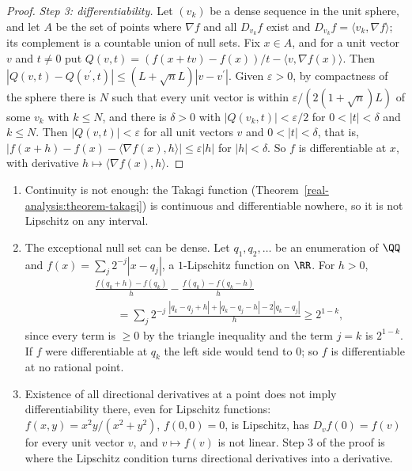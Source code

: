 \begin{proof}
\emph{Step 3: differentiability.} Let $(v_k)$ be a dense sequence in the unit sphere, and let $A$ be the set of points where $\nabla f$ and all $D_{v_k}f$ exist and
$D_{v_k}f = \langle v_k, \nabla f\rangle$; its complement is a countable union of null sets. Fix $x \in A$, and for a unit vector $v$ and $t \neq 0$ put
$Q(v, t) = (f(x + tv) - f(x))/t - \langle v, \nabla f(x)\rangle$. Then $|Q(v, t) - Q(v^{\prime}, t)| \leq (L + \sqrt nL)|v - v^{\prime}|$. Given $\varepsilon > 0$, by compactness of the
sphere there is $N$ such that every unit vector is within $\varepsilon/(2(1 + \sqrt n)L)$ of some $v_k$ with $k \leq N$, and there is $\delta > 0$ with $|Q(v_k, t)| < \varepsilon/2$ for
$0 < |t| < \delta$ and $k \leq N$. Then $|Q(v, t)| < \varepsilon$ for all unit vectors $v$ and $0 < |t| < \delta$, that is, $|f(x + h) - f(x) - \langle\nabla f(x), h\rangle| \leq \varepsilon|h|$ for
$|h| < \delta$. So $f$ is differentiable at $x$, with derivative $h \mapsto \langle\nabla f(x), h\rangle$.
\end{proof}

\begin{counterexample}\label{geometric-measure-theory:counterexample-rademacher}
\begin{enumerate}
\item Continuity is not enough: the Takagi function (Theorem~\ref{real-analysis:theorem-takagi}) is continuous and differentiable nowhere, so it is not Lipschitz on any interval.
\item The exceptional null set can be dense. Let $q_1, q_2, \ldots$ be an enumeration of $\QQ$ and $f(x) = \sum_j2^{-j}|x - q_j|$, a $1$-Lipschitz function on $\RR$. For $h > 0$,
\[\begin{aligned}
&\frac{f(q_k + h) - f(q_k)}{h} - \frac{f(q_k) - f(q_k - h)}{h} \\
&\qquad = \sum_j2^{-j}\,\frac{|q_k - q_j + h| + |q_k - q_j - h| - 2|q_k - q_j|}{h} \geq 2^{1-k},
\end{aligned}\]
since every term is $\geq 0$ by the triangle inequality and the term $j = k$ is $2^{1-k}$. If $f$ were differentiable at $q_k$ the left side would tend to $0$; so $f$ is differentiable at no
rational point.
\item Existence of all directional derivatives at a point does not imply differentiability there, even for Lipschitz functions: $f(x, y) = x^2y/(x^2 + y^2)$, $f(0, 0) = 0$, is Lipschitz,
has $D_vf(0) = f(v)$ for every unit vector $v$, and $v \mapsto f(v)$ is not linear. Step 3 of the proof is where the Lipschitz condition turns directional derivatives into a derivative.
\end{enumerate}
\end{counterexample}

